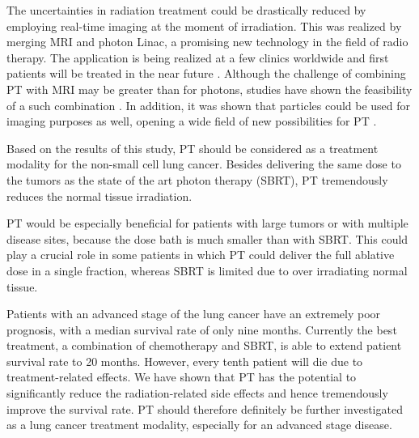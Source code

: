 The uncertainties in radiation treatment could be drastically reduced by employing real-time imaging at the moment of irradiation.
This was realized by merging MRI and photon Linac, a promising new technology in the field of radio therapy. The application is being realized at a few clinics
worldwide and first patients will be treated in the near future \cite{Lagendijk2016}.
Although the challenge of combining PT with MRI may be greater than for photons, studies have shown the feasibility of a such combination \cite{Hartman2015}.
In addition, it was shown that particles could be used for imaging purposes as well, opening a wide
field of new possibilities for PT \cite{Prall2016}.

Based on the results of this study, PT should be considered as a treatment modality for the non-small cell lung cancer. Besides delivering 
the same dose to the tumors as the state of the art photon therapy (SBRT), PT tremendously reduces the normal tissue irradiation.

\newpage

PT would be especially beneficial for patients with large tumors or with multiple disease sites, because the dose bath is much
smaller than with SBRT. This could play a crucial role in some patients in which PT could deliver the full ablative dose in a single fraction, whereas SBRT is limited due to over 
irradiating normal tissue.


Patients with an advanced stage of the lung cancer have an extremely poor prognosis, with a median survival rate of only nine months. 
Currently the best treatment, a combination of chemotherapy and SBRT, is able to extend patient survival rate to 20 months. 
However, every tenth patient will die due to treatment-related effects. We have shown that PT has the potential to 
significantly reduce the radiation-related side effects and hence tremendously improve the survival rate.
PT should therefore definitely be further investigated as a lung cancer treatment modality, especially for an advanced stage disease.

